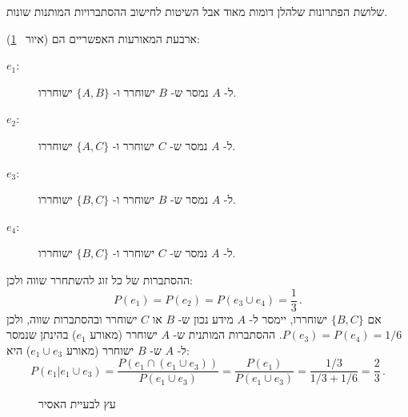 שלושת הפתרונות שלהלן דומות מאוד אבל השיטות לחישוב ההסתברויות המותנות שונות.


ארבעת המאורעות האפשריים הם (איור%
~\ref{f.pp}):
\begin{description}
\item[$e_1$:] 
ל-%
$A$
נמסר ש-%
$B$
ישוחרר ו-%
$\{A,B\}$
ישוחררו.
\item[$e_2$:]
ל-%
$A$
נמסר ש-%
$C$
ישוחרר ו-%
$\{A,C\}$
ישוחררו.
\item[$e_3$:]
ל-%
$A$
נמסר ש-%
$B$
ישוחרר ו-%
$\{B,C\}$
ישוחררו.
\item[$e_4$:]
ל-%
$A$
נמסר ש-%
$C$
ישוחרר ו-%
$\{B,C\}$
ישוחררו.
\end{description}
ההסתברות של כל זוג להשתחרר שווה ולכן:
\[
P(e_1)=P(e_2)=P(e_3\cup e_4)=\frac{1}{3}\,.
\]
אם 
$\{B,C\}$
ישוחררו, יימסר ל-%
$A$
מידע נכון ש-%
$B$
או 
$C$
ישוחרר ובהסתברות שווה, ולכן
$P(e_3)=P(e_4)=1/6$.
ההסתברות המותנית ש-%
$A$
ישוחרר (מאורע
$e_1$)
בהינתן שנמסר ל-%
$A$
ש-%
$B$
ישוחרר (מאורע
$e_1\cup e_3$)
היא:
\[
P(e_1|e_1\cup e_3) = \frac{P(e_1\cap(e_1\cup e_3))}{P(e_1\cup e_3)}=\frac{P(e_1)}{P(e_1\cup e_3)}=\frac{1/3}{1/3+1/6}=\frac{2}{3}\,.
\]

\begin{figure}[tb]
\begin{center}
\caption{עץ לבעיית האסיר}\label{f.pp}
\end{center}
\end{figure}


